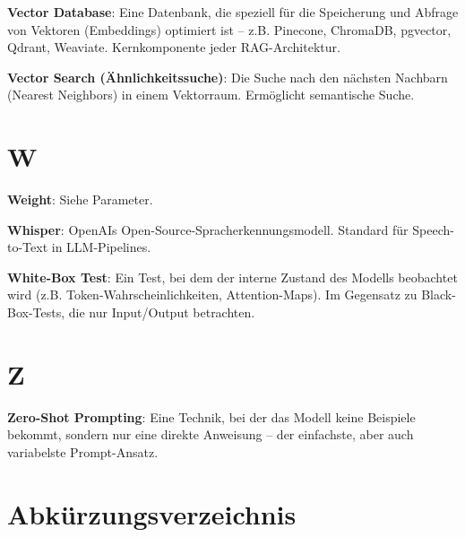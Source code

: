 \textbf{Vector Database}\hspace{0pt}: Eine Datenbank, die speziell für die Speicherung und Abfrage von Vektoren (Embeddings) optimiert ist -- z.B. Pinecone, ChromaDB, pgvector, Qdrant, Weaviate. Kernkomponente jeder RAG-Architektur.

\textbf{Vector Search (Ähnlichkeitssuche)}\hspace{0pt}: Die Suche nach den nächsten Nachbarn (Nearest Neighbors) in einem Vektorraum. Ermöglicht semantische Suche.

\section{W}

\textbf{Weight}\hspace{0pt}: Siehe Parameter.

\textbf{Whisper}\hspace{0pt}: OpenAIs Open-Source-Spracherkennungsmodell. Standard für Speech-to-Text in LLM-Pipelines.

\textbf{White-Box Test}\hspace{0pt}: Ein Test, bei dem der interne Zustand des Modells beobachtet wird (z.B. Token-Wahrscheinlichkeiten, Attention-Maps). Im Gegensatz zu Black-Box-Tests, die nur Input/Output betrachten.

\section{Z}

\textbf{Zero-Shot Prompting}\hspace{0pt}: Eine Technik, bei der das Modell keine Beispiele bekommt, sondern nur eine direkte Anweisung -- der einfachste, aber auch variabelste Prompt-Ansatz.

\section*{Abkürzungsverzeichnis}

